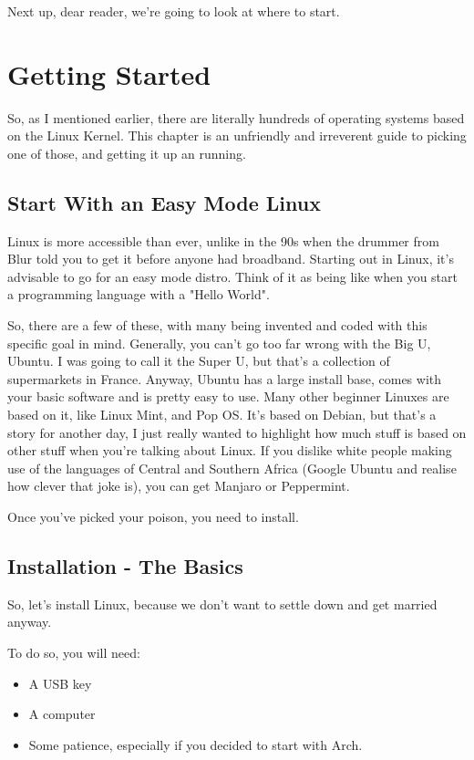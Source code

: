 \documentclass{book}
\begin{document}
Next up, dear reader, we're going to look at where to start.

\chapter{Getting Started}
So, as I mentioned earlier, there are literally hundreds of operating systems based on the Linux Kernel. This chapter is an unfriendly and irreverent guide to picking one of those, and getting it up an running. 


\section{Start With an Easy Mode Linux}

Linux is more accessible than ever, unlike in the 90s when the drummer from Blur told you to get it before anyone had broadband. Starting out in Linux, it's advisable to go for an easy mode distro. Think of it as being like when you start a programming language with a "Hello World". 

So, there are a few of these, with many being invented and coded with this specific goal in mind. Generally, you can't go too far wrong with the Big U, Ubuntu. I was going to call it the Super U, but that's a collection of supermarkets in France. Anyway, Ubuntu has a large install base, comes with your basic software and is pretty easy to use. Many other beginner Linuxes are based on it, like Linux Mint, and Pop OS. It's based on Debian, but that's a story for another day, I just really wanted to highlight how much stuff is based on other stuff when you're talking about Linux. If you dislike white people making use of the languages of Central and Southern Africa (Google Ubuntu and realise how clever that joke is), you can get Manjaro or Peppermint.

Once you've picked your poison, you need to install.

\section{Installation - The Basics}
So, let's install Linux, because we don't want to settle down and get married anyway. 

To do so, you will need:

\begin{itemize}
    \item A USB key
    \item A computer
    \item Some patience, especially if you decided to start with Arch.
\end{itemize}
\end{document}
